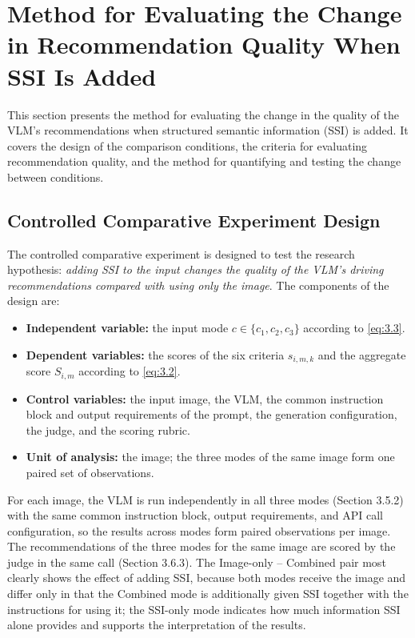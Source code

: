 \documentclass[12pt,a4paper]{report}
\begin{document}
\section{Method for Evaluating the Change in Recommendation Quality When SSI Is Added}

This section presents the method for evaluating the change in the quality of the VLM's recommendations when structured semantic information (SSI) is added. It covers the design of the comparison conditions, the criteria for evaluating recommendation quality, and the method for quantifying and testing the change between conditions.

\subsection{Controlled Comparative Experiment Design}

The controlled comparative experiment is designed to test the research hypothesis: \textit{adding SSI to the input changes the quality of the VLM's driving recommendations compared with using only the image}. The components of the design are:

\begin{itemize}
    \item \textbf{Independent variable:} the input mode $c \in \{c_1, c_2, c_3\}$ according to \eqref{eq:3.3}.
    \item \textbf{Dependent variables:} the scores of the six criteria $s_{i,m,k}$ and the aggregate score $S_{i,m}$ according to \eqref{eq:3.2}.
    \item \textbf{Control variables:} the input image, the VLM, the common instruction block and output requirements of the prompt, the generation configuration, the judge, and the scoring rubric.
    \item \textbf{Unit of analysis:} the image; the three modes of the same image form one paired set of observations.
\end{itemize}

For each image, the VLM is run independently in all three modes (Section 3.5.2) with the same common instruction block, output requirements, and API call configuration, so the results across modes form paired observations per image. The recommendations of the three modes for the same image are scored by the judge in the same call (Section 3.6.3). The Image-only -- Combined pair most clearly shows the effect of adding SSI, because both modes receive the image and differ only in that the Combined mode is additionally given SSI together with the instructions for using it; the SSI-only mode indicates how much information SSI alone provides and supports the interpretation of the results.
\end{document}
